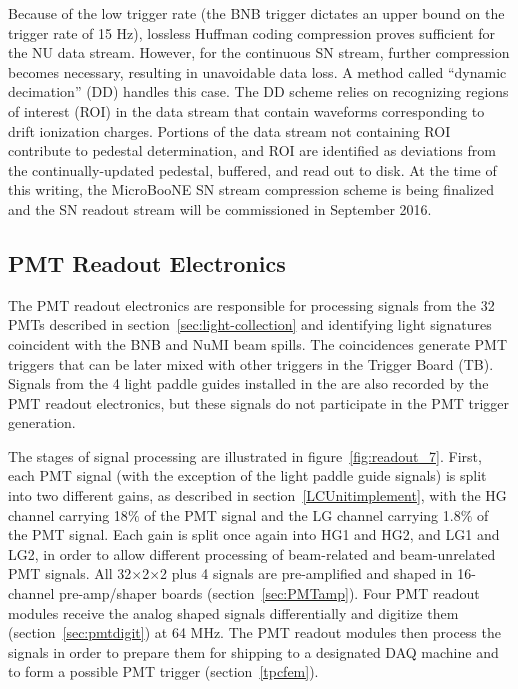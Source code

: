Because of the low trigger rate (the BNB trigger dictates an upper bound on the trigger rate of 15 Hz), lossless Huffman coding compression proves sufficient for the NU data stream. However, for the continuous SN stream, further compression becomes necessary, resulting in unavoidable data loss. A method called ``dynamic decimation'' (DD) handles this case. The DD scheme relies on recognizing regions of interest (ROI) in the data stream that contain waveforms corresponding to drift ionization charges. Portions of the data stream not containing ROI contribute to pedestal determination, and ROI are identified as deviations from the continually-updated pedestal, buffered, and read out to disk. At the time of this writing, the MicroBooNE SN stream compression scheme is being finalized and the SN readout stream will be commissioned in September 2016.

\subsection{PMT Readout Electronics}

The PMT readout electronics are responsible for processing signals from the 32 PMTs described in section~\ref{sec:light-collection} and identifying light signatures coincident with the BNB and NuMI beam spills. The coincidences generate PMT triggers that can be later mixed with other triggers in the Trigger Board (TB). Signals from the 4 light paddle guides installed in the \lartpc are also recorded by the PMT readout electronics, but these signals do not participate in the PMT trigger generation. 

The stages of signal processing are illustrated in figure~\ref{fig:readout_7}. First, each PMT signal (with the exception of the light paddle guide signals) is split into two different gains, as described in section~\ref{LCUnitimplement}, with the HG channel carrying 18$\%$ of the PMT signal and the LG channel carrying 1.8$\%$ of the PMT signal. Each gain is split once again into HG1 and HG2, and LG1 and LG2, in order to allow different processing of beam-related and beam-unrelated PMT signals. All 32$\times$2$\times$2 plus 4 signals are pre-amplified and shaped in 16-channel pre-amp/shaper boards (section~\ref{sec:PMTamp}). Four PMT readout modules receive the analog shaped signals differentially and digitize them (section~\ref{sec:pmtdigit}) at 64 MHz. The PMT readout modules then process the signals in order to prepare them for shipping to a designated DAQ machine and to form a possible PMT trigger (section~\ref{tpcfem}). 

